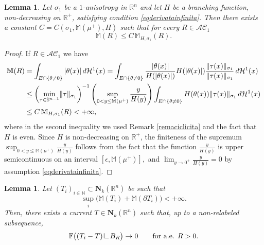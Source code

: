 \documentclass{article}
\numberwithin{equation}{section}
\theoremstyle{plain}%
\newtheorem{lemma}[theorem]{Lemma}
\theoremstyle{definition}
\theoremstyle{definition}
\newcommand{\rgrande}{\mathbb{R}}
\newcommand{\haus}{\mathcal{H}}
\newcommand{\massa}{\mathbb{M}}
\newcommand{\massaanisotropauno}{\mathbb{M}_{H,\sigma_1}}
\newcommand{\mrestr}{\mathop{\hbox{\vrule height 7pt width 0.5pt depth 0pt
\vrule height 0.5pt width 6pt depth 0pt}}\nolimits}
\DeclarePairedDelimiter{\norma}{\lVert}{\rVert} %
\DeclarePairedDelimiter{\valass}{\lvert}{\rvert} %
\begin{document}
\begin{lemma}\label{lemmamassaequilim}
Let $\sigma_1$ be a $1$-anisotropy in $ \rgrande^n$ and let $H$ be a branching function, non-decreasing on $\rgrande^+$, satisfying condition \eqref{eqderivatainfinita}. Then there exists a constant $C = C(\sigma_1, \massa(\mu^+), H)$ such that for every $R \in \mathcal{AC}_1$
\begin{equation*}
    \massa (R) \leq C \, \massaanisotropauno(R)
    \text{.}
\end{equation*}
\end{lemma}
\begin{proof}
If $R \in \mathcal{AC}_1$ we have
\begin{equation*}
\begin{split}
\massa(R) & =
\int_{E \cap \{ \theta \neq 0 \} } {\valass{\theta(x)}} \,d \haus^1(x)
=
\int_{E \cap \{ \theta \neq 0 \}} {
\frac{\valass{\theta(x)}}{H(\valass{\theta(x)})} H(\valass{\theta(x)})  \frac{\norma{\tau(x)}_{\sigma_1}}{\norma{\tau(x)}_{\sigma_1}}
} \,d \haus^1(x) \\
&
\leq
\left(\min_{\tau \in\mathbb{S}^{n-1}}\norma{\tau}_{\sigma_1}\right)^{-1}
\left( \sup_{0<y \leq \massa(\mu^+)}\frac{y}{H(y)} \right)
\int_{E \cap \{ \theta \neq 0 \}} {
H(\theta(x)) \norma{\tau(x)}_{\sigma_1}
} \, d \haus^1(x)
\\
&
\leq
C\,\massaanisotropauno(R) < + \infty
\text{,}
\end{split}
\end{equation*}
where in the second inequality we used Remark \ref{remaciclicita} and the fact that $H$ is even. Since $H$ is non-decreasing on $\rgrande^+$, the finiteness of the supremum $ \sup_{0<y \leq \massa(\mu^+)}\frac{y}{H(y)}$ follows from the fact that the function $\frac{y}{H(y)}$ is upper semicontinuous on an interval $[\epsilon, \massa(\mu^+)],$ and $\lim_{y \to 0^+} \frac{y}{H(y)} = 0$ by assumption \eqref{eqderivatainfinita}.
\end{proof}

\begin{lemma}\label{lemmacompattezzalocale}
Let $(T_i)_{i\in\mathbb{N}} \subset \mathbf N_k(\mathbb R^n)$ be such that
$$
\sup_i \bigl(\mathbb M(T_i)+\mathbb M(\partial T_i)\bigr)<+\infty.
$$
Then, there exists a current
$T\in \mathbf N_k(\mathbb R^n)$ such that, up to a non-relabeled subsequence,
$$
\mathbb F\bigl((T_i-T)\mrestr B_R\bigr)\to 0
\qquad \text{for a.e. } R>0.
$$
\end{lemma}
\end{document}
